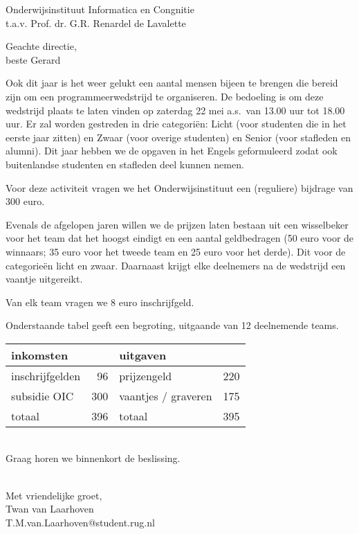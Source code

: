 \documentclass[a4paper]{letter}
\begin{document}
\begin{letter}{Onderwijsinstituut Informatica en Congnitie\\
               t.a.v. Prof. dr. G.R. Renardel de Lavalette}%
\opening{Geachte directie,\\beste Gerard}
%
%
Ook dit jaar is het weer gelukt een aantal mensen bijeen te brengen
die bereid zijn om een programmeerwedstrijd te organiseren.
De bedoeling is om deze wedstrijd plaats te laten vinden op
zaterdag 22 mei a.s.\ van 13.00 uur tot 18.00 uur.
Er zal worden gestreden in drie categori\"en: Licht (voor studenten
die in het eerste jaar zitten) en Zwaar (voor overige
studenten) en Senior (voor stafleden en alumni).
Dit jaar hebben we de opgaven in het Engels geformuleerd zodat ook buitenlandse studenten en stafleden deel kunnen nemen.

Voor deze activiteit vragen we het Onderwijsinstituut een (reguliere)
bijdrage van 300 euro.

Evenals de afgelopen jaren willen we de prijzen laten bestaan uit een
wisselbeker voor het team dat het hoogst eindigt en een aantal
geldbedragen (50 euro voor de winnaars; 35 euro voor het tweede team
en 25 euro voor het derde).  Dit voor de categorie\"en licht en zwaar.
Daarnaast krijgt elke deelnemers na de wedstrijd een vaantje
uitgereikt.

Van elk team vragen we 8 euro inschrijfgeld.

Onderstaande tabel geeft een begroting, uitgaande van 12 deelnemende
teams.
\begin{center}
\begin{tabular}{l r || l r}
inkomsten   &   & uitgaven & \\
\hline
inschrijfgelden    &  96           & prijzengeld          & 220 \\
subsidie OIC       & 300           & vaantjes / graveren  & 175 \\
totaal             & 396           & totaal               & 395 \\
\hline

\end{tabular}
\end{center}
\strut \\[3ex]
Graag horen we binnenkort de beslissing.
\strut \\[3ex]
Met vriendelijke groet,
\\[7ex]
Twan van Laarhoven\\
T.M.van.Laarhoven@student.rug.nl
\end{letter}
\end{document}
